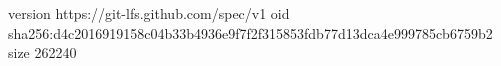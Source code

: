 version https://git-lfs.github.com/spec/v1
oid sha256:d4c2016919158c04b33b4936e9f7f2f315853fdb77d13dca4e999785cb6759b2
size 262240
